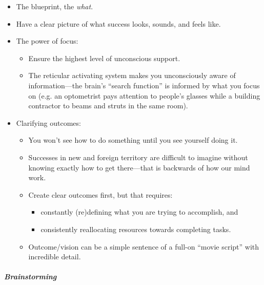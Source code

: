 \documentclass{article}
\begin{document}
\begin{itemize}
  \item The blueprint, the \textit{what}.
  \item Have a clear picture of what success looks, sounds, and feels like.
  \item The power of focus:
  \begin{itemize}
    \item Ensure the highest level of unconscious support.
    \item The reticular activating system makes you unconsciously aware of information---the brain's ``search function'' is informed by what you focus on (e.g. an optometrist pays attention to people's glasses while a building contractor to beams and struts in the same room).
  \end{itemize}
  \item Clarifying outcomes:
  \begin{itemize}
    \item You won't see how to do something until you see yourself doing it.
    \item Successes in new and foreign territory are difficult to imagine without knowing exactly how to get there---that is backwards of how our mind work.
    \item Create clear outcomes first, but that requires:
    \begin{itemize}
      \item constantly (re)defining what you are trying to accomplish, and
      \item consistently reallocating resources towards completing tasks.
    \end{itemize}
    \item Outcome/vision can be a simple sentence of a full-on ``movie script'' with incredible detail.
  \end{itemize}
\end{itemize}

\subparagraph{Brainstorming}
\end{document}
